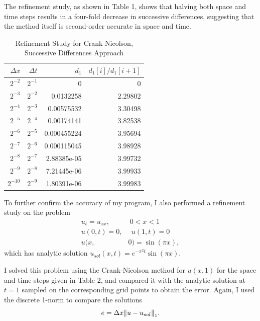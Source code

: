 \documentclass[12pt]{article}
\begin{document}
The refinement study, as shown in Table 1, shows that halving both space and time steps results in a four-fold decrease in successive differences, suggesting that the method itself is second-order accurate in space and time.
\begin{table}[H]
\caption{Refinement Study for Crank-Nicolson, Successive Differences Approach}
\centering\begin{tabular}{||r|r|r|r||}
\hline \hline
     $\Delta x$ &   $\Delta t$ &   $d_1$ &   $d_1[i]/d_1[i+1]$ \\
\hline 
 $2^{-2}$  & $2^{-1}$ & 0           &       0       \\
 $2^{-3}$  & $2^{-2}$ & 0.0132258   &       2.29802 \\
 $2^{-4}$  & $2^{-3}$ & 0.00575532  &       3.30498 \\
 $2^{-5}$  & $2^{-4}$ & 0.00174141  &       3.82538 \\
 $2^{-6}$  & $2^{-5}$ & 0.000455224 &       3.95694 \\
 $2^{-7}$  & $2^{-6}$ & 0.000115045 &       3.98928 \\
 $2^{-8}$  & $2^{-7}$ & 2.88385e-05 &       3.99732 \\
 $2^{-9}$  & $2^{-8}$ & 7.21445e-06 &       3.99933 \\
 $2^{-10}$ & $2^{-9}$ & 1.80391e-06 &       3.99983 \\
\hline \hline
\end{tabular}
\end{table}

To further confirm the accuracy of my program, I also performed a refinement study on the problem
\begin{align*}
u_t = u_{xx}, &\ 0<x<1 \\
u(0,t)=0, &\ \ u(1,t)=0 \\
u(x,&0) = \sin(\pi x),
\end{align*}
which has analytic solution $u_{sol}(x,t) = e^{-\pi^2 t}\sin(\pi x)$.

I solved this problem using the Crank-Nicolson method for $u(x,1)$ for the space and time steps given in Table 2, and compared it with the analytic solution at $t=1$ sampled on the corresponding grid points to obtain the error.  Again, I used the discrete 1-norm to compare the solutions
$$ e = \Delta x \norm{u - u_{sol}}_1.$$
\end{document}
